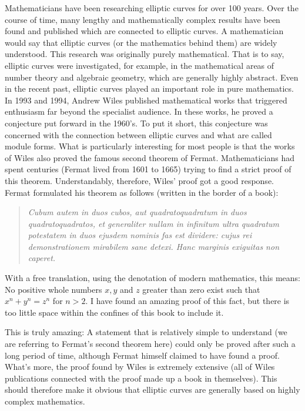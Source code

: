 Mathematicians have been researching elliptic curves for over 100 years.
Over the course of time, many lengthy and mathematically complex results
have been found and published which are connected to elliptic curves. 
A mathematician would say that elliptic curves (or the mathematics behind
them) are widely understood. This research was originally purely 
mathematical. That is to say, elliptic curves were investigated, for 
example, in the mathematical areas of number theory and algebraic 
geometry, which are generally highly abstract. Even in the recent
past, elliptic curves played an important role in pure mathematics.
In 1993 and 1994, Andrew Wiles published 
mathematical works that triggered enthusiasm far beyond the specialist
audience. In these works, he proved a conjecture put forward in the 1960's.
To put it short, this conjecture was concerned with the connection 
between elliptic curves and what are called module forms. What is
particularly interesting for most people is that the works of Wiles
also proved the famous second theorem of Fermat. Mathematicians had
spent centuries (Fermat lived from 1601 to 1665) trying to find a
strict proof of this theorem. Understandably, therefore, Wiles' proof
got a good response. Fermat formulated his theorem as follows 
(written in the border of a book):

\begin{quote} {\em
Cubum autem in duos cubos, aut quadratoquadratum in duos quadratoquadratos, et
generaliter nullam in infinitum ultra quadratum potestatem in duos ejusdem
nominis fas est dividere: cujus rei demonstrationem mirabilem sane detexi. Hanc
marginis exiguitas non caperet.
} \end{quote}

With a free translation, using the denotation of modern mathematics, this means: \\
No positive whole numbers $x, y$ and $z$ greater than zero exist such that $x^n +y^n = z^n$ for $n>2$. I have found an amazing proof of this fact, but there is
too little space within the confines of this book to include it.

This is truly amazing: A statement that is relatively simple to understand (we
are referring to Fermat's second theorem here) could only be proved after such a
long period of time, although Fermat himself claimed to have found a proof.
What's more, the proof found by Wiles is extremely extensive (all of Wiles
publications connected with the proof made up a book in themselves). This should
therefore make it obvious that elliptic curves are generally based on highly
complex mathematics.

